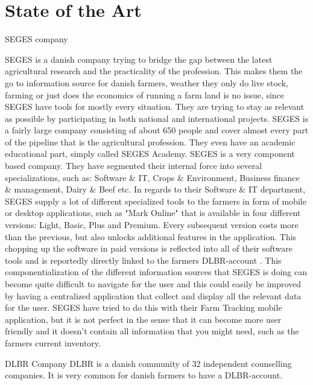 \section{State of the Art}

SEGES company 

SEGES is a danish company trying to bridge the gap between the latest agricultural research and the practicality of the profession. This makes them the go to information source for danish farmers, weather they only do live stock, farming or just does the economics of running a farm land is no issue, since SEGES have tools for mostly every situation. They are trying to stay as relevant as possible by participating in both national and international projects. 
SEGES is a fairly large company consisting of about 650 people and cover almost every part of the pipeline that is the agricultural profession. They even have an academic educational part, simply called SEGES Academy. SEGES is a very component based company. They have segmented their internal force into several specializations, such as: Software \& IT, Crops \& Environment, Business finance \& management, Dairy \& Beef etc. 
In regards to their Software \& IT department, SEGES supply a lot of different specialized tools to the farmers in form of mobile or desktop applications, such as "Mark Online"  that is available in four different versions: Light, Basic, Plus and Premium. Every subsequent version costs more than the previous, but also unlocks additional features in the application. This chopping up the software in paid versions is reflected into all of their software tools and is reportedly  directly linked to the farmers DLBR-account . 
This componentialization of the different information sources that SEGES is doing can become quite difficult to navigate for the user and this could easily be improved by having a centralized application that collect and display all the relevant data for the user. SEGES have tried to do this with their Farm Tracking mobile application, but it is not perfect in the sense that it can become more user friendly and it doesn't contain all information that you might need, such as the farmers current inventory.

DLBR Company 
DLBR is a danish community of 32 independent counselling companies. It is very common for danish farmers to have a DLBR-account.  




